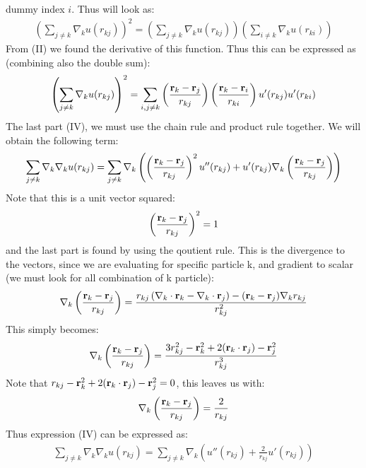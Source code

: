 \documentclass[a4paper, 10pt]{article}
\begin{document}
dummy index $i$. Thus will look as:
\begin{align}
  \left(\sum_{j\neq k}\nabla_{k} u(r_{kj})\right)^2 = \left(\sum_{j\neq k}\nabla_{k} u(r_{kj})\right)\left(\sum_{i\neq k}\nabla_{k} u(r_{ki})\right)
\end{align}
From (II) we found the derivative of this function. Thus this can be expressed as (combining also the double sum):
\begin{align}
  \left(\sum_{j\neq k}\nabla_{k} u(r_{kj})\right)^2 =
  \sum_{i, j\neq k}\left(\frac{\bold{r}_{k} - \bold{r}_{j}}{r_{kj}}\right)
  \left(\frac{\bold{r}_{k} - \bold{r}_{i}}{r_{ki}}\right)u'(r_{kj})u'(r_{ki})
\end{align}
The last part (IV), we must use the chain rule and product rule together. We will obtain
the following term:
\begin{align}
  \sum_{j \neq k}\nabla_{k}\nabla_{k}u(r_{kj}) =
  \sum_{j \neq k}\nabla_{k}\left(
  \left(\frac{\bold{r}_{k} - \bold{r}_{j}}{r_{kj}}\right)^2 u''(r_{kj}) + u'(r_{kj})\nabla_{k}
  \left(\frac{\bold{r}_{k} - \bold{r}_{j}}{r_{kj}}\right)\right)
\end{align}
Note that this is a unit vector squared:
\begin{align}
  \left(\frac{\bold{r}_{k} - \bold{r}_{j}}{r_{kj}}\right)^2 = 1
\end{align}
and the last part is found by using the qoutient rule. This is the divergence to the vectors, since we are evaluating for
specific particle k, and gradient to scalar (we must look for all combination of k particle):
\begin{align}
  \nabla_{k}
  \left(\frac{\bold{r}_{k} - \bold{r}_{j}}{r_{kj}}\right)
  = \frac{r_{kj}\left(\nabla_{k}\cdot\bold{r}_{k}-
  \nabla_{k}\cdot\bold{r}_{j}\right) -
  (\bold{r}_{k}-\bold{r}_{j})\nabla_{k}r_{kj}}{r_{kj}^2}
\end{align}
This simply becomes:
\begin{align}
  \nabla_{k}
  \left(\frac{\bold{r}_{k} - \bold{r}_{j}}{r_{kj}}\right)
  = \frac{3r_{kj}^2 - \bold{r}^2_{k} + 2(\bold{r}_{k}\cdot \bold{r}_{j}) - \bold{r}^2_{j}}{r_{kj}^3}
\end{align}
Note that $r_{kj} - \bold{r}^2_{k} + 2(\bold{r}_{k}\cdot \bold{r}_{j}) - \bold{r}^2_{j} = 0$, this leaves us with:
\begin{align}
  \nabla_{k}
  \left(\frac{\bold{r}_{k} - \bold{r}_{j}}{r_{kj}}\right)
  = \frac{2}{r_{kj}}
\end{align}
Thus expression (IV) can be expressed as:
\begin{align}
  \sum_{j \neq k}\nabla_{k}\nabla_{k}u(r_{kj}) =
  \sum_{j \neq k}\nabla_{k}\left(u''(r_{kj}) + \frac{2}{r_{kj}}u'(r_{kj})
\right)
\end{align}
\end{document}
